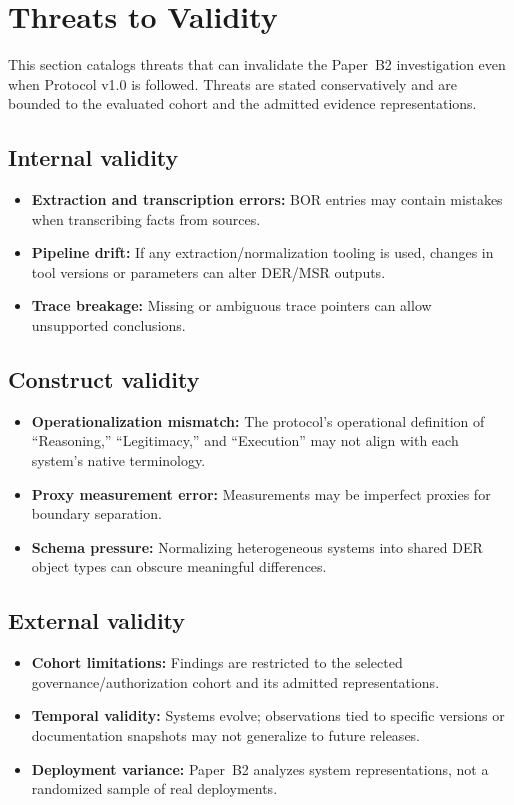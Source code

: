 \section{Threats to Validity}
\label{sec:threats}
This section catalogs threats that can invalidate the Paper~B2 investigation even when Protocol v1.0 is followed. Threats are stated conservatively and are bounded to the evaluated cohort and the admitted evidence representations.

\subsection{Internal validity}
\begin{itemize}
  \item \textbf{Extraction and transcription errors:} BOR entries may contain mistakes when transcribing facts from sources.
  \item \textbf{Pipeline drift:} If any extraction/normalization tooling is used, changes in tool versions or parameters can alter DER/MSR outputs.
  \item \textbf{Trace breakage:} Missing or ambiguous trace pointers can allow unsupported conclusions.
\end{itemize}

\subsection{Construct validity}
\begin{itemize}
  \item \textbf{Operationalization mismatch:} The protocol's operational definition of ``Reasoning,'' ``Legitimacy,'' and ``Execution'' may not align with each system's native terminology.
  \item \textbf{Proxy measurement error:} Measurements may be imperfect proxies for boundary separation.
  \item \textbf{Schema pressure:} Normalizing heterogeneous systems into shared DER object types can obscure meaningful differences.
\end{itemize}

\subsection{External validity}
\begin{itemize}
  \item \textbf{Cohort limitations:} Findings are restricted to the selected governance/authorization cohort and its admitted representations.
  \item \textbf{Temporal validity:} Systems evolve; observations tied to specific versions or documentation snapshots may not generalize to future releases.
  \item \textbf{Deployment variance:} Paper~B2 analyzes system representations, not a randomized sample of real deployments.
\end{itemize}

